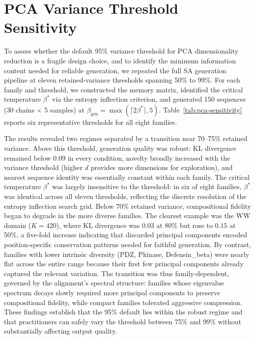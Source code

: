 \documentclass[10pt]{article}
\begin{document}
\section{PCA Variance Threshold Sensitivity}\label{si:pca-sensitivity}

To assess whether the default 95\% variance threshold for PCA dimensionality reduction is a fragile design choice, and to identify the minimum information content needed for reliable generation, we repeated the full SA generation pipeline at eleven retained-variance thresholds spanning 50\% to 99\%. For each family and threshold, we constructed the memory matrix, identified the critical temperature $\beta^*$ via the entropy inflection criterion, and generated 150 sequences (30 chains $\times$ 5 samples) at $\beta_{\mathrm{gen}} = \max(\lceil 2\beta^* \rceil, 5)$. Table~\ref{tab:pca-sensitivity} reports six representative thresholds for all eight families.

The results revealed two regimes separated by a transition near 70--75\% retained variance. Above this threshold, generation quality was robust: KL divergence remained below 0.09 in every condition, novelty broadly increased with the variance threshold (higher $d$ provides more dimensions for exploration), and nearest sequence identity was essentially constant within each family. The critical temperature $\beta^*$ was largely insensitive to the threshold: in six of eight families, $\beta^*$ was identical across all eleven thresholds, reflecting the discrete resolution of the entropy inflection search grid. Below 70\% retained variance, compositional fidelity began to degrade in the more diverse families. The clearest example was the WW domain ($K{=}420$), where KL divergence was $0.03$ at 80\% but rose to $0.15$ at 50\%, a five-fold increase indicating that discarded principal components encoded position-specific conservation patterns needed for faithful generation. By contrast, families with lower intrinsic diversity (PDZ, Pkinase, Defensin\_beta) were nearly flat across the entire range because their first few principal components already captured the relevant variation. The transition was thus family-dependent, governed by the alignment's spectral structure: families whose eigenvalue spectrum decays slowly required more principal components to preserve compositional fidelity, while compact families tolerated aggressive compression. These findings establish that the 95\% default lies within the robust regime and that practitioners can safely vary the threshold between 75\% and 99\% without substantially affecting output quality.
\end{document}
